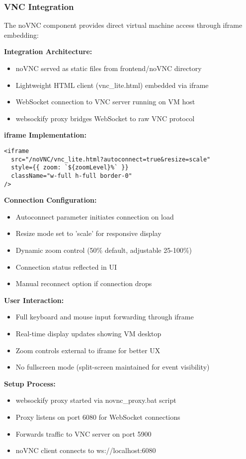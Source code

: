\subsubsection{VNC Integration}

The noVNC component provides direct virtual machine access through iframe embedding:

\textbf{Integration Architecture:}
\begin{itemize}
    \item noVNC served as static files from frontend/noVNC directory
    \item Lightweight HTML client (vnc\_lite.html) embedded via iframe
    \item WebSocket connection to VNC server running on VM host
    \item websockify proxy bridges WebSocket to raw VNC protocol
\end{itemize}

\textbf{iframe Implementation:}
\begin{verbatim}
<iframe 
  src="/noVNC/vnc_lite.html?autoconnect=true&resize=scale"
  style={{ zoom: `${zoomLevel}%` }}
  className="w-full h-full border-0"
/>
\end{verbatim}

\textbf{Connection Configuration:}
\begin{itemize}
    \item Autoconnect parameter initiates connection on load
    \item Resize mode set to 'scale' for responsive display
    \item Dynamic zoom control (50\% default, adjustable 25-100\%)
    \item Connection status reflected in UI
    \item Manual reconnect option if connection drops
\end{itemize}

\textbf{User Interaction:}
\begin{itemize}
    \item Full keyboard and mouse input forwarding through iframe
    \item Real-time display updates showing VM desktop
    \item Zoom controls external to iframe for better UX
    \item No fullscreen mode (split-screen maintained for event visibility)
\end{itemize}

\textbf{Setup Process:}
\begin{itemize}
    \item websockify proxy started via novnc\_proxy.bat script
    \item Proxy listens on port 6080 for WebSocket connections
    \item Forwards traffic to VNC server on port 5900
    \item noVNC client connects to ws://localhost:6080
\end{itemize}

